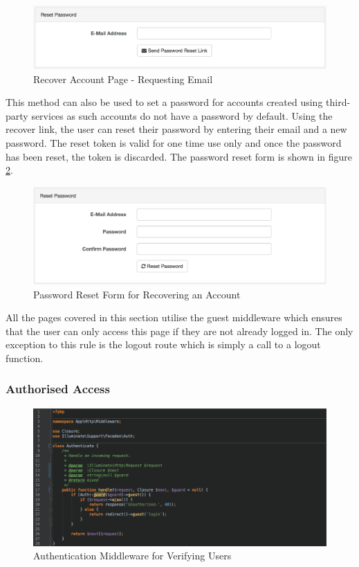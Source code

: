 \begin{figure}[H]
	\centering
	\includegraphics[width=1.0\textwidth]{images/Frisk/Recover_Form}
	\caption{Recover Account Page - Requesting Email} \label{fig:Recover_Form}
\end{figure}

This method can also be used to set a password for accounts created using third-party services as such accounts do not have a password by default. Using the recover link, the user can reset their password by entering their email and a new password. The reset token is valid for one time use only and once the password has been reset, the token is discarded. The password reset form is shown in figure \ref{fig:Reset_Form}.

\begin{figure}[H]
	\centering
	\includegraphics[width=1.0\textwidth]{images/Frisk/Reset_Form}
	\caption{Password Reset Form for Recovering an Account} \label{fig:Reset_Form}
\end{figure}

All the pages covered in this section utilise the guest middleware which ensures that the user can only access this page if they are not already logged in. The only exception to this rule is the logout route which is simply a call to a logout function.

\subsubsection{Authorised Access}

\begin{figure}[H]
	\centering
	\includegraphics[width=1.0\textwidth]{images/Code/Middleware_Auth}
	\caption{Authentication Middleware for Verifying Users} \label{fig:Middleware_Auth}
\end{figure}

